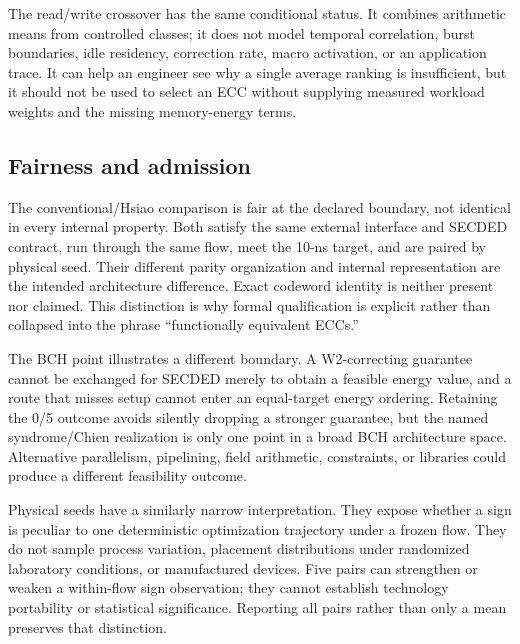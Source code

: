 \documentclass[conference,10pt]{IEEEtran}
\begin{document}
The read/write crossover has the same conditional status. It combines arithmetic means from controlled classes; it does not model temporal correlation, burst boundaries, idle residency, correction rate, macro activation, or an application trace. It can help an engineer see why a single average ranking is insufficient, but it should not be used to select an ECC without supplying measured workload weights and the missing memory-energy terms.

\subsection{Fairness and admission}
The conventional/Hsiao comparison is fair at the declared boundary, not identical in every internal property. Both satisfy the same external interface and SECDED contract, run through the same flow, meet the 10-ns target, and are paired by physical seed. Their different parity organization and internal representation are the intended architecture difference. Exact codeword identity is neither present nor claimed. This distinction is why formal qualification is explicit rather than collapsed into the phrase ``functionally equivalent ECCs.''

The BCH point illustrates a different boundary. A W2-correcting guarantee cannot be exchanged for SECDED merely to obtain a feasible energy value, and a route that misses setup cannot enter an equal-target energy ordering. Retaining the 0/5 outcome avoids silently dropping a stronger guarantee, but the named syndrome/Chien realization is only one point in a broad BCH architecture space. Alternative parallelism, pipelining, field arithmetic, constraints, or libraries could produce a different feasibility outcome.

Physical seeds have a similarly narrow interpretation. They expose whether a sign is peculiar to one deterministic optimization trajectory under a frozen flow. They do not sample process variation, placement distributions under randomized laboratory conditions, or manufactured devices. Five pairs can strengthen or weaken a within-flow sign observation; they cannot establish technology portability or statistical significance. Reporting all pairs rather than only a mean preserves that distinction.
\end{document}
